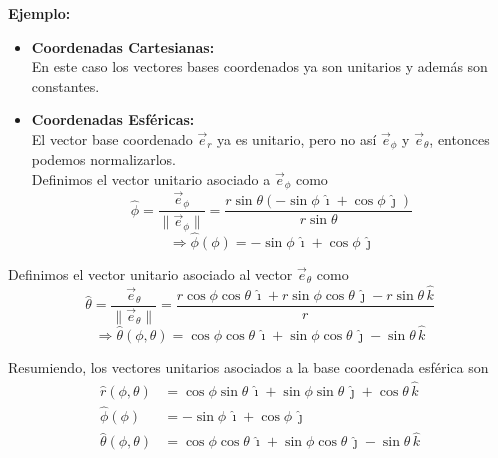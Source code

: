 \documentclass[../apunte_mecanica_clasica.tex]{subfiles}%
\begin{document}
\textbf{Ejemplo:}
\begin{itemize}
    \item[a)] \textbf{Coordenadas Cartesianas:} \\
    En este caso los vectores bases coordenados ya son unitarios y además son constantes.

    \item[b)] \textbf{Coordenadas Esféricas:} \\
    El vector base coordenado $\vec{e}_r$ ya es unitario, pero no así $\vec{e}_\phi$ y $\vec{e}_\theta$, entonces podemos normalizarlos. \\
    Definimos el vector unitario asociado a $\vec{e}_\phi$ como
    \begin{equation*}
        \hat{\phi} = \frac{\vec{e}_\phi}{\|\vec{e}_\phi\|} = \frac{r \sin\theta (-\sin\phi\, \hat{\imath} + \cos\phi\, \hat{\jmath})}{r \sin\theta}
    \end{equation*}
    \begin{equation*}
        \Rightarrow \hat{\phi}(\phi) = -\sin\phi\, \hat{\imath} + \cos\phi\, \hat{\jmath}
    \end{equation*}
\end{itemize}

Definimos el vector unitario asociado al vector $\vec{e}_\theta$ como
\begin{equation*}
    \hat{\theta} = \frac{\vec{e}_\theta}{\|\vec{e}_\theta\|} 
    = \frac{r \cos\phi \cos\theta\, \hat{\imath} + r \sin\phi \cos\theta\, \hat{\jmath} - r \sin\theta\, \hat{k}}{r}
\end{equation*}
\begin{equation*}
    \Rightarrow \hat{\theta}(\phi, \theta) = \cos\phi \cos\theta\, \hat{\imath} + \sin\phi \cos\theta\, \hat{\jmath} - \sin\theta\, \hat{k}
\end{equation*}

Resumiendo, los vectores unitarios asociados a la base coordenada esférica son
\begin{equation*}
\begin{aligned}
    \hat{r}(\phi, \theta) &= \cos\phi \sin\theta\, \hat{\imath} + \sin\phi \sin\theta\, \hat{\jmath} + \cos\theta\, \hat{k} \\
    \hat{\phi}(\phi) &= -\sin\phi\, \hat{\imath} + \cos\phi\, \hat{\jmath} \\
    \hat{\theta}(\phi, \theta) &= \cos\phi \cos\theta\, \hat{\imath} + \sin\phi \cos\theta\, \hat{\jmath} - \sin\theta\, \hat{k}
\end{aligned}
\end{equation*}
\end{document}
